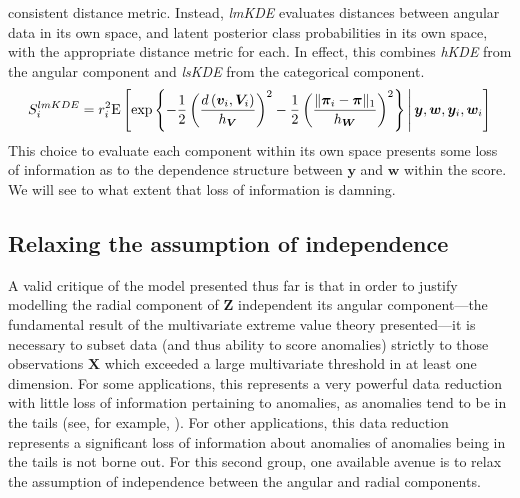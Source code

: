    consistent distance metric.  Instead, \emph{lmKDE} evaluates distances 
    between angular data in its own space, and latent posterior class 
    probabilities in its own space, with the appropriate distance metric for 
    each.  In effect, this combines \emph{hKDE} from
    the angular component and \emph{lsKDE} from the categorical component.
    \[
    S_i^{lmKDE} = r_i^2 \text{E}\left[
        \exp
        \left\lbrace 
        -\frac{1}{2}
        \left(
        \frac{d\left(\bm{v}_i, \bm{V}_i\right)}{h_{\bm{V}}}
        \right)^2
        -\frac{1}{2}
        \left(
        \frac{\lVert\bm{\pi}_i - \bm{\pi}\rVert_1}{h_{\bm{W}}}
        \right)^2
        \right\rbrace
        \,\middle\vert\, \bm{y},\bm{w},\bm{y}_i,\bm{w}_i\right]
    \]
    This choice to evaluate each component within its own space presents some 
    loss of information as to the dependence structure between $\bm{y}$ and 
    $\bm{w}$ within the score.  We will see to what extent that loss of 
    information is damning.

\subsection{Relaxing the assumption of independence\label{subsec:rank}}
A valid critique of the model presented thus far is that in order to justify 
    modelling the radial component of $\bm{Z}$ independent its angular 
    component---the fundamental result of the multivariate extreme value theory 
    presented---it is necessary to subset data (and thus ability to score 
    anomalies) strictly to those observations $\bm{X}$ which exceeded a large 
    multivariate threshold in at least one dimension.  For some applications, 
    this represents a very powerful data reduction with little loss of 
    information pertaining to anomalies, as anomalies tend to be in the tails 
    (see, for  example, ).  For other applications, this data reduction represents a 
    significant loss of information about anomalies of anomalies being in the 
    tails is not borne out.  For this second group, one available avenue is to 
    relax the assumption of independence between the angular and radial 
    components.

